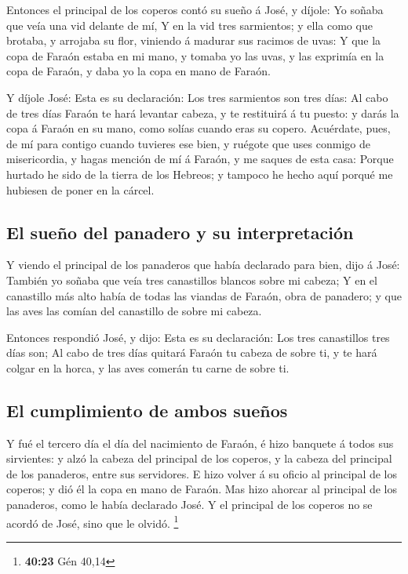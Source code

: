  Entonces el principal de los coperos contó su sueño á José,
y díjole: Yo soñaba que veía una vid delante de mí,  Y en
la vid tres sarmientos; y ella como que brotaba, y arrojaba su flor,
viniendo á madurar sus racimos de uvas:  Y que la copa de
Faraón estaba en mi mano, y tomaba yo las uvas, y las exprimía en la
copa de Faraón, y daba yo la copa en mano de Faraón.

 Y díjole José: Esta es su declaración: Los tres sarmientos
son tres días:  Al cabo de tres días Faraón te hará
levantar cabeza, y te restituirá á tu puesto: y darás la copa á Faraón
en su mano, como solías cuando eras su copero.  Acuérdate,
pues, de mí para contigo cuando tuvieres ese bien, y ruégote que uses
conmigo de misericordia, y hagas mención de mí á Faraón, y me saques de
esta casa:  Porque hurtado he sido de la tierra de los
Hebreos; y tampoco he hecho aquí porqué me hubiesen de poner en la
cárcel.

\hypertarget{el-sueuxf1o-del-panadero-y-su-interpretaciuxf3n}{%
\subsection{El sueño del panadero y su
interpretación}\label{el-sueuxf1o-del-panadero-y-su-interpretaciuxf3n}}

 Y viendo el principal de los panaderos que había declarado
para bien, dijo á José: También yo soñaba que veía tres canastillos
blancos sobre mi cabeza;  Y en el canastillo más alto había
de todas las viandas de Faraón, obra de panadero; y que las aves las
comían del canastillo de sobre mi cabeza.

 Entonces respondió José, y dijo: Esta es su declaración:
Los tres canastillos tres días son;  Al cabo de tres días
quitará Faraón tu cabeza de sobre ti, y te hará colgar en la horca, y
las aves comerán tu carne de sobre ti.

\hypertarget{el-cumplimiento-de-ambos-sueuxf1os}{%
\subsection{El cumplimiento de ambos
sueños}\label{el-cumplimiento-de-ambos-sueuxf1os}}

 Y fué el tercero día el día del nacimiento de Faraón, é
hizo banquete á todos sus sirvientes: y alzó la cabeza del principal de
los coperos, y la cabeza del principal de los panaderos, entre sus
servidores.  E hizo volver á su oficio al principal de los
coperos; y dió él la copa en mano de Faraón.  Mas hizo
ahorcar al principal de los panaderos, como le había declarado José.
 Y el principal de los coperos no se acordó de José, sino
que le olvidó. \footnote{\textbf{40:23} Gén 40,14}

